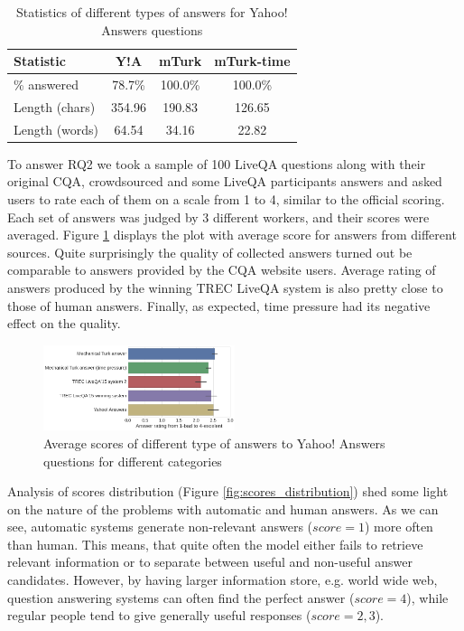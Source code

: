 \documentclass[11pt,letterpaper]{article}
\begin{document}
\begin{table}[h]
\centering
\caption{Statistics of different types of answers for Yahoo! Answers questions}
\begin{tabular}{| p{2.3cm} | c | c | c |}
\hline
Statistic & Y!A & mTurk & mTurk-time\\
\hline
\% answered & 78.7\% & 100.0\% & 100.0\% \\
Length (chars) & 354.96 & 190.83 & 126.65 \\
Length (words) & 64.54 & 34.16 & 22.82 \\
\hline
\end{tabular}
\label{table:answer_stats}
\end{table}

To answer RQ2 we took a sample of 100 LiveQA questions along with their original CQA, crowdsourced and some LiveQA participants answers and asked users to rate each of them on a scale from 1 to 4, similar to the official scoring.
Each set of answers was judged by 3 different workers, and their scores were averaged.
Figure \ref{fig:average_score} displays the plot with average score for answers from different sources.
Quite surprisingly the quality of collected answers turned out be comparable to answers provided by the CQA website users.
Average rating of answers produced by the winning TREC LiveQA system is also pretty close to those of human answers.
Finally, as expected, time pressure had its negative effect on the quality.

\begin{figure}[h]
	\centering
	\includegraphics[width=0.5\textwidth]{img/average_score}
	\caption{Average scores of different type of answers to Yahoo! Answers questions for different categories}
	\label{fig:average_score}
\end{figure}

Analysis of scores distribution (Figure \ref{fig:scores_distribution}) shed some light on the nature of the problems with automatic and human answers.
As we can see, automatic systems generate non-relevant answers ($score=1$) more often than human.
This means, that quite often the model either fails to retrieve relevant information or to separate between useful and non-useful answer candidates.
However, by having larger information store, e.g. world wide web, question answering systems can often find the perfect answer ($score=4$), while regular people tend to give generally useful responses ($score=2,3$).
\end{document}
